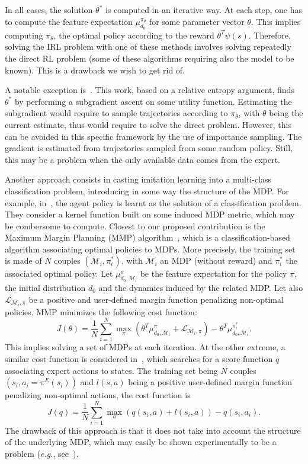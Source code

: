 \documentclass{article}
\begin{document}
In all cases, the solution $\theta^*$ is computed in an iterative
way. At each step, one has to compute the feature expectation
$\mu^{\pi_\theta}_{d_0}$ for some parameter vector $\theta$. This
implies computing $\pi_\theta$, the optimal policy according to the
reward $\theta^T\psi(s)$. Therefore, solving the IRL problem with
one of these methods involves solving repeatedly the direct RL
problem (some of these algorithms requiring also the model to be
known). This is a drawback we wish to get rid of.

A notable exception is~\cite{boularias2011relative}. This work,
based on a relative entropy argument, finds $\theta^*$ by performing
a subgradient ascent on some utility function. Estimating the
subgradient would require to sample trajectories according to
$\pi_\theta$, with $\theta$ being the current estimate, thus would
require to solve the direct problem. However, this can be avoided in
this specific framework by the use of importance sampling. The
gradient is estimated from trajectories sampled from some random
policy. Still, this may be a problem when the only available data
comes from the expert.

Another approach consists in casting imitation learning into a
multi-class classification problem, introducing in some way the
structure of the MDP. For example, in~\cite{melo2010learning}, the
agent policy is learnt as the solution of a classification problem.
They consider a kernel function built on some induced MDP metric,
which may be combersome to compute. Closest to our proposed
contribution is the Maximum Margin Planning (MMP)
algorithm~\cite{ratliff2006maximum}, which is a classification-based
algorithm associating optimal policies to MDPs. More precisely, the
training set is made of $N$ couples $(\mathcal{M}_i,\pi^*_i)$, with
$\mathcal{M}_i$ an MDP (without reward) and $\pi_i^*$ the associated
optimal policy. Let $\mu^\pi_{d_0,\mathcal{M}_i}$ be the feature
expectation for the policy $\pi$, the initial distribution $d_0$ and
the dynamics induced by the related MDP. Let also
$\mathcal{L}_{\mathcal{M}_i,\pi}$ be a positive and user-defined
margin function penalizing non-optimal policies. MMP minimizes the
following cost function:
\begin{equation}
  J(\theta) = \frac{1}{N}\sum_{i=1}^N \max_\pi(\theta^T
  \mu^\pi_{d_0,\mathcal{M}_i} + \mathcal{L}_{\mathcal{M}_i,\pi}) - \theta^T
  \mu^{\pi_i^*}_{d_0,\mathcal{M}_i}.\nonumber
\end{equation}
This implies solving a set of MDPs at each iteration. At the other
extreme, a similar cost function is considered
in~\cite{ratliff2007imitation}, which searches for a score function
$q$ associating expert actions to states. The training set being $N$
couples $(s_i,a_i=\pi^E(s_i))$ and $l(s,a)$ being a positive
user-defined margin function penalizing non-optimal actions, the
cost function is
\begin{equation}
  J(q) = \frac{1}{N}\sum_{i=1}^N \max_a (q(s_i,a) +
  l(s_i,a))-q(s_i,a_i).\nonumber
\end{equation}
The drawback of this approach is that it does not take into account
the structure of the underlying MDP, which may easily be shown
experimentally to be a problem (\textit{e.g.},
see~\cite{melo2010learning}).
\end{document}
